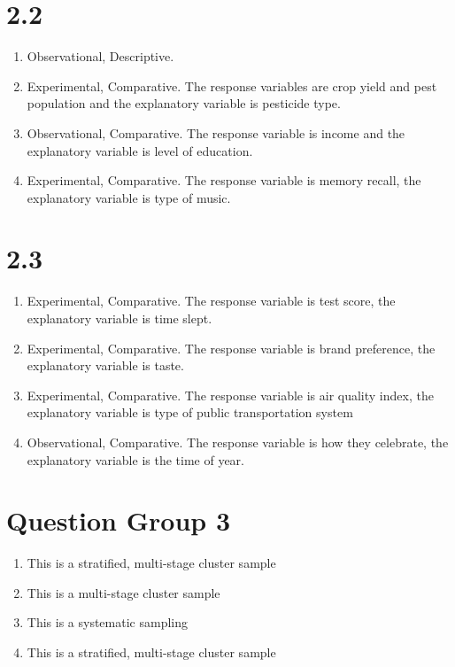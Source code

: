 \documentclass{article}
\begin{document}
\section*{2.2}
\begin{enumerate}
\item Observational, Descriptive. \\
\item Experimental, Comparative. The response variables are crop yield and pest population and the explanatory variable is pesticide type. \\
\item Observational, Comparative. The response variable is income and the explanatory variable is level of education. \\
\item Experimental, Comparative. The response variable is memory recall, the explanatory variable is type of music.
\end{enumerate}
\section*{2.3}
\begin{enumerate}
\item Experimental, Comparative. The response variable is test score, the explanatory variable is time slept. \\
\item Experimental, Comparative. The response variable is brand preference, the explanatory variable is taste. \\
\item Experimental, Comparative. The response variable is air quality index, the explanatory variable is type of public transportation system \\
\item Observational, Comparative. The response variable is how they celebrate, the explanatory variable is the time of year. \\
\end{enumerate}
\section*{Question Group 3}
\begin{enumerate}
\item This is a stratified, multi-stage cluster sample \\
\item This is a multi-stage cluster sample \\
\item This is a systematic sampling \\
\item This is a stratified, multi-stage cluster sample \\
\end{enumerate}
\end{document}
